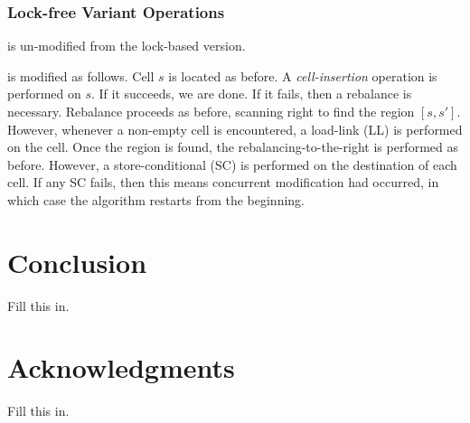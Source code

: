 \documentclass{style}
\begin{document}
\subsubsection{Lock-free Variant Operations}

\Search{} is un-modified from the lock-based version.

\Insert{} is modified as follows. Cell $s$ is located as before. A
\textit{cell-insertion} operation is performed on $s$. If it succeeds, we are
done. If it fails, then a rebalance is necessary. Rebalance proceeds as
before, scanning right to find the region $[s, s']$. However, whenever a
non-empty cell is encountered, a load-link (LL) is performed on the cell. Once
the region is found, the rebalancing-to-the-right is performed as before.
However, a store-conditional (SC) is performed on the destination of each
cell. If any SC fails, then this means concurrent modification had occurred,
in which case the algorithm restarts from the beginning.

\section{Conclusion}
Fill this in.

\section{Acknowledgments}
Fill this in.

%



\end{document}
